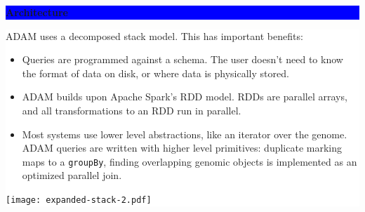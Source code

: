 \documentclass[11pt]{a0poster}
\begin{document}
{\begin{minipage}[t][2045pt][t]{\linewidth}
\begin{minipage}{0.6\linewidth}
\vspace{70pt}
\colorbox{Blue}{
\begin{minipage}[t]{\linewidth}
\vspace{30pt}
\begin{center}
\Huge \bf \color{White} Architecture
\end{center}
\vspace{17pt}
\end{minipage}
}
\colorbox{White}{
\begin{minipage}[t][1000pt][t]{\linewidth}
\begin{minipage}{0.005\linewidth}
\hfill
\pagebreak
\end{minipage}
\begin{minipage}{0.32\linewidth}
\vspace{10pt}
\LARGE
\color{Blue}
ADAM uses a decomposed stack model. This has important benefits:
\begin{itemize}
\item Queries are programmed against a schema. The user doesn't need to know the
format of data on disk, or where data is physically stored.
\item ADAM builds upon Apache Spark's RDD model. RDDs are parallel arrays,
and all transformations to an RDD run in parallel.
\item Most systems use lower level abstractions, like an iterator over the genome.
ADAM queries are written with higher level primitives: duplicate marking maps to
a \texttt{groupBy}, finding overlapping genomic objects is implemented as an
optimized parallel join.
\end{itemize}
\end{minipage}
\begin{minipage}{0.005\linewidth}
\hfill
\pagebreak
\end{minipage}
\begin{minipage}{0.64\linewidth}
\vspace{30pt}
\hspace{100pt}
\texttt{[image: expanded-stack-2.pdf]}
\end{minipage}
\pagebreak
\end{minipage}
}


\end{minipage}
\end{minipage}}
\end{document}
